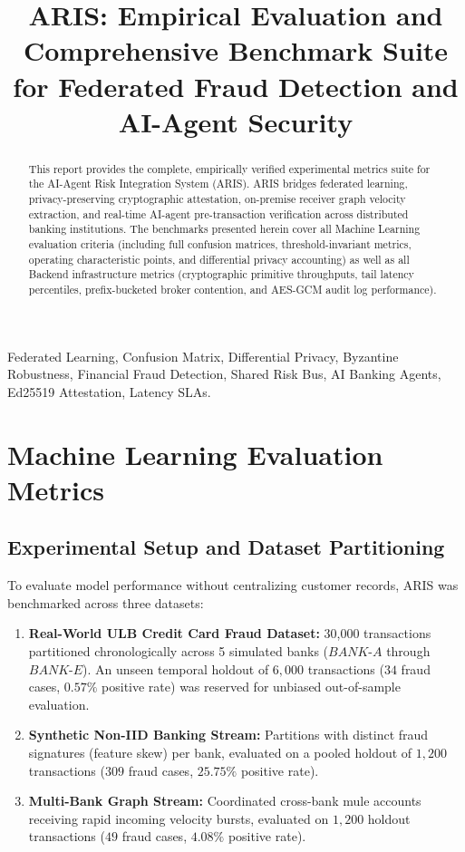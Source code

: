 \documentclass[conference]{IEEEtran}
\title{ARIS: Empirical Evaluation and Comprehensive Benchmark Suite for Federated Fraud Detection and AI-Agent Security}
\author{
    \IEEEauthorblockN{ARIS Research \& Engineering Consortium}
    \IEEEauthorblockA{\textit{Distributed AI, Financial Cryptography \& Agent Systems Group}}
}
\begin{document}
\maketitle

\begin{abstract}
This report provides the complete, empirically verified experimental metrics suite for the AI-Agent Risk Integration System (ARIS). ARIS bridges federated learning, privacy-preserving cryptographic attestation, on-premise receiver graph velocity extraction, and real-time AI-agent pre-transaction verification across distributed banking institutions. The benchmarks presented herein cover all Machine Learning evaluation criteria (including full confusion matrices, threshold-invariant metrics, operating characteristic points, and differential privacy accounting) as well as all Backend infrastructure metrics (cryptographic primitive throughputs, tail latency percentiles, prefix-bucketed broker contention, and AES-GCM audit log performance).
\end{abstract}

\begin{IEEEkeywords}
Federated Learning, Confusion Matrix, Differential Privacy, Byzantine Robustness, Financial Fraud Detection, Shared Risk Bus, AI Banking Agents, Ed25519 Attestation, Latency SLAs.
\end{IEEEkeywords}

\section{Machine Learning Evaluation Metrics}
\label{sec:ml_metrics}

\subsection{Experimental Setup and Dataset Partitioning}
To evaluate model performance without centralizing customer records, ARIS was benchmarked across three datasets:
\begin{enumerate}
    \item \textbf{Real-World ULB Credit Card Fraud Dataset:} 30,000 transactions partitioned chronologically across 5 simulated banks ($BANK\text{-}A$ through $BANK\text{-}E$). An unseen temporal holdout of $6,000$ transactions ($34$ fraud cases, $0.57\%$ positive rate) was reserved for unbiased out-of-sample evaluation.
    \item \textbf{Synthetic Non-IID Banking Stream:} Partitions with distinct fraud signatures (feature skew) per bank, evaluated on a pooled holdout of $1,200$ transactions ($309$ fraud cases, $25.75\%$ positive rate).
    \item \textbf{Multi-Bank Graph Stream:} Coordinated cross-bank mule accounts receiving rapid incoming velocity bursts, evaluated on $1,200$ holdout transactions ($49$ fraud cases, $4.08\%$ positive rate).
\end{enumerate}
\end{document}
